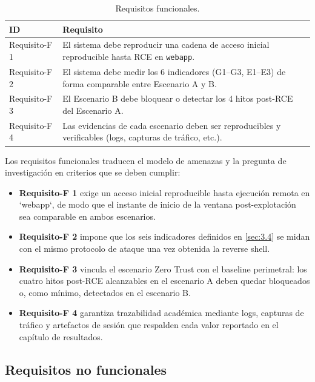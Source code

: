 \documentclass[11pt,spanish,listoffigures,listoftables]{tfgetsinf}
\begin{document}
        \begin{table}[ht]
          \centering
          \label{tab:requisitos-funcionales}
          \begin{tabular}{p{2.8cm} p{10cm}}
            \textbf{ID} & \textbf{Requisito} \\
            \midrule
            Requisito-F 1 & El sistema debe reproducir una cadena de acceso inicial reproducible hasta RCE en \texttt{webapp}. \\
            \midrule
            Requisito-F 2 & El sistema debe medir los 6 indicadores (G1--G3, E1--E3) de forma comparable entre Escenario A y B. \\
            \midrule
            Requisito-F 3 & El Escenario B debe bloquear o detectar los 4 hitos post-RCE del Escenario A. \\
            \midrule
            Requisito-F 4 & Las evidencias de cada escenario deben ser reproducibles y verificables (logs, capturas de tráfico, etc.). \\
            \bottomrule
          \end{tabular}
          \caption{Requisitos funcionales.}
        \end{table}
        
        Los requisitos funcionales traducen el modelo de amenazas y la pregunta de investigación en criterios que se deben cumplir:
        \begin{itemize}
            \item \textbf{Requisito-F 1} exige un acceso inicial reproducible hasta ejecución remota en `webapp`, de modo que el instante de inicio de la ventana post-explotación sea comparable en ambos escenarios.
            \item \textbf{Requisito-F 2} impone que los seis indicadores definidos en \cref{sec:3.4} se midan con el mismo protocolo de ataque una vez obtenida la reverse shell.
            \item \textbf{Requisito-F 3} vincula el escenario Zero Trust con el baseline perimetral: los cuatro hitos post-RCE alcanzables en el escenario A deben quedar bloqueados o, como mínimo, detectados en el escenario B.
            \item \textbf{Requisito-F 4} garantiza trazabilidad académica mediante logs, capturas de tráfico y artefactos de sesión que respalden cada valor reportado en el capítulo de resultados.
        \end{itemize}
        
        \subsection{Requisitos no funcionales}
        
\end{document}
